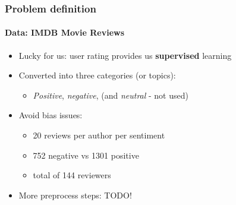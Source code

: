 \documentclass{beamer}
\begin{document}
\begin{frame}
	\frametitle{Problem definition}
	\framesubtitle{Data: IMDB Movie Reviews}
	\begin{itemize}
		\item Lucky for us: user rating provides us \textbf{supervised} learning
		\item Converted into three categories (or topics):
		\begin{itemize}
			\item \emph{Positive}, \emph{negative}, (and \emph{neutral} - not used)
		\end{itemize}
		\item Avoid bias issues:
		\begin{itemize}
			\item 20 reviews per author per sentiment
			\item 752 negative vs 1301 positive
			\item total of 144 reviewers
		\end{itemize}
		\item More preprocess steps: TODO!
	\end{itemize}
\end{frame}

\end{document}
